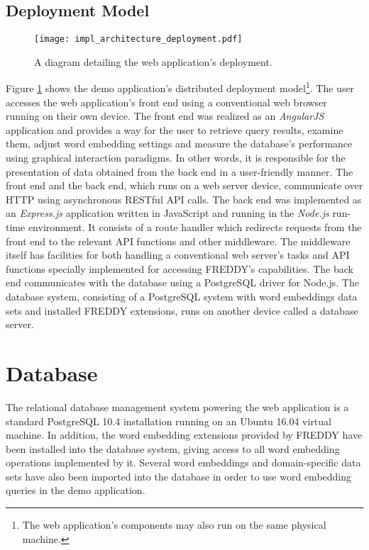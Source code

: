 \subsection{Deployment Model}
\begin{figure}
	\centering\texttt{[image: impl\_architecture\_deployment.pdf]}
	\caption{A diagram detailing the web application's deployment.}
	\label{fig:architecture_deployment}
\end{figure}
Figure \ref{fig:architecture_deployment} shows the demo application's distributed deployment model\footnote{The web application's components may also run on the same physical machine.}. The user accesses the web application's front end using a conventional web browser running on their own device. The front end was realized as an \textit{AngularJS} application and provides a way for the user to retrieve query results, examine them, adjust word embedding settings and measure the database's performance using graphical interaction paradigms. In other words, it is responsible for the presentation of data obtained from the back end in a user-friendly manner. The front end and the back end, which runs on a web server device, communicate over HTTP using asynchronous RESTful API calls. The back end was implemented as an \textit{Express.js} application written in JavaScript and running in the \textit{Node.js} run-time environment. It consists of a route handler which redirects requests from the front end to the relevant API functions and other middleware. The middleware itself has facilities for both handling a conventional web server's tasks and API functions specially implemented for accessing FREDDY's capabilities. The back end communicates with the database using a PostgreSQL driver for Node.js. The database system, consisting of a PostgreSQL system with word embeddings data sets and installed FREDDY extensions, runs on another device called a database server.

\section{Database}
The relational database management system powering the web application is a standard PostgreSQL 10.4 installation running on an Ubuntu 16.04 virtual machine. In addition, the word embedding extensions provided by FREDDY have been installed into the database system, giving access to all word embedding operations implemented by it. Several word embeddings and domain-specific data sets have also been imported into the database in order to use word embedding queries in the demo application.

